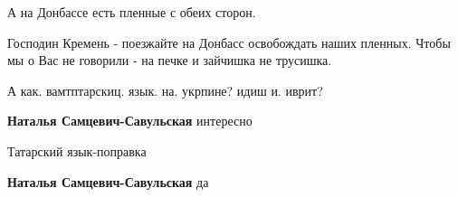 \begin{itemize}
А на Донбассе есть пленные с обеих сторон.

 
Господин Кремень - поезжайте на Донбасс освобождать наших пленных. Чтобы мы о Вас не говорили - на печке и зайчишка не трусишка.

 
А как. вамтптарскиц. язык. на. укрпине? идиш и. иврит?

\begin{itemize}
 
\textbf{Наталья Самцевич-Савульская} интересно
\end{itemize}

 
Татарский язык-поправка

\begin{itemize}
 
\textbf{Наталья Самцевич-Савульская} да
\end{itemize}

\end{itemize}


